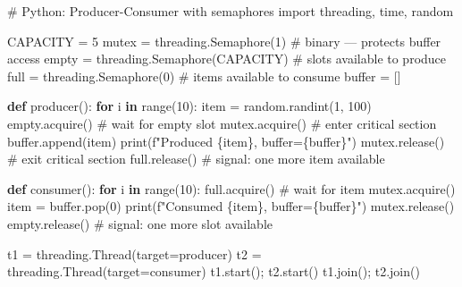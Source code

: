 \documentclass[11pt]{article}
\newenvironment{Shaded}{\begin{snugshade}}{\end{snugshade}}
\newcommand{\BuiltInTok}[1]{\textcolor[rgb]{0.50,0.55,0.55}{#1}}
\newcommand{\CommentTok}[1]{\textcolor[rgb]{0.48,0.49,0.49}{#1}}
\newcommand{\ControlFlowTok}[1]{\textcolor[rgb]{0.99,0.74,0.29}{\textbf{#1}}}
\newcommand{\DecValTok}[1]{\textcolor[rgb]{0.96,0.45,0.00}{#1}}
\newcommand{\ImportTok}[1]{\textcolor[rgb]{0.15,0.68,0.38}{#1}}
\newcommand{\KeywordTok}[1]{\textcolor[rgb]{0.81,0.81,0.76}{\textbf{#1}}}
\newcommand{\NormalTok}[1]{\textcolor[rgb]{0.81,0.81,0.76}{#1}}
\newcommand{\OperatorTok}[1]{\textcolor[rgb]{0.81,0.81,0.76}{#1}}
\newcommand{\SpecialCharTok}[1]{\textcolor[rgb]{0.24,0.68,0.91}{#1}}
\newcommand{\SpecialStringTok}[1]{\textcolor[rgb]{0.85,0.27,0.33}{#1}}
\begin{document}
\begin{Shaded}
\begin{Highlighting}[]
\CommentTok{\# Python: Producer{-}Consumer with semaphores}
\ImportTok{import}\NormalTok{ threading, time, random}

\NormalTok{CAPACITY }\OperatorTok{=} \DecValTok{5}
\NormalTok{mutex }\OperatorTok{=}\NormalTok{ threading.Semaphore(}\DecValTok{1}\NormalTok{)   }\CommentTok{\# binary — protects buffer access}
\NormalTok{empty }\OperatorTok{=}\NormalTok{ threading.Semaphore(CAPACITY)  }\CommentTok{\# slots available to produce}
\NormalTok{full  }\OperatorTok{=}\NormalTok{ threading.Semaphore(}\DecValTok{0}\NormalTok{)         }\CommentTok{\# items available to consume}
\BuiltInTok{buffer} \OperatorTok{=}\NormalTok{ []}

\KeywordTok{def}\NormalTok{ producer():}
    \ControlFlowTok{for}\NormalTok{ i }\KeywordTok{in} \BuiltInTok{range}\NormalTok{(}\DecValTok{10}\NormalTok{):}
\NormalTok{        item }\OperatorTok{=}\NormalTok{ random.randint(}\DecValTok{1}\NormalTok{, }\DecValTok{100}\NormalTok{)}
\NormalTok{        empty.acquire()      }\CommentTok{\# wait for empty slot}
\NormalTok{        mutex.acquire()      }\CommentTok{\# enter critical section}
        \BuiltInTok{buffer}\NormalTok{.append(item)}
        \BuiltInTok{print}\NormalTok{(}\SpecialStringTok{f"Produced }\SpecialCharTok{\{}\NormalTok{item}\SpecialCharTok{\}}\SpecialStringTok{, buffer=}\SpecialCharTok{\{}\BuiltInTok{buffer}\SpecialCharTok{\}}\SpecialStringTok{"}\NormalTok{)}
\NormalTok{        mutex.release()      }\CommentTok{\# exit critical section}
\NormalTok{        full.release()       }\CommentTok{\# signal: one more item available}

\KeywordTok{def}\NormalTok{ consumer():}
    \ControlFlowTok{for}\NormalTok{ i }\KeywordTok{in} \BuiltInTok{range}\NormalTok{(}\DecValTok{10}\NormalTok{):}
\NormalTok{        full.acquire()       }\CommentTok{\# wait for item}
\NormalTok{        mutex.acquire()}
\NormalTok{        item }\OperatorTok{=} \BuiltInTok{buffer}\NormalTok{.pop(}\DecValTok{0}\NormalTok{)}
        \BuiltInTok{print}\NormalTok{(}\SpecialStringTok{f"Consumed }\SpecialCharTok{\{}\NormalTok{item}\SpecialCharTok{\}}\SpecialStringTok{, buffer=}\SpecialCharTok{\{}\BuiltInTok{buffer}\SpecialCharTok{\}}\SpecialStringTok{"}\NormalTok{)}
\NormalTok{        mutex.release()}
\NormalTok{        empty.release()      }\CommentTok{\# signal: one more slot available}

\NormalTok{t1 }\OperatorTok{=}\NormalTok{ threading.Thread(target}\OperatorTok{=}\NormalTok{producer)}
\NormalTok{t2 }\OperatorTok{=}\NormalTok{ threading.Thread(target}\OperatorTok{=}\NormalTok{consumer)}
\NormalTok{t1.start()}\OperatorTok{;}\NormalTok{ t2.start()}
\NormalTok{t1.join()}\OperatorTok{;}\NormalTok{ t2.join()}
\end{Highlighting}
\end{Shaded}
\end{document}
